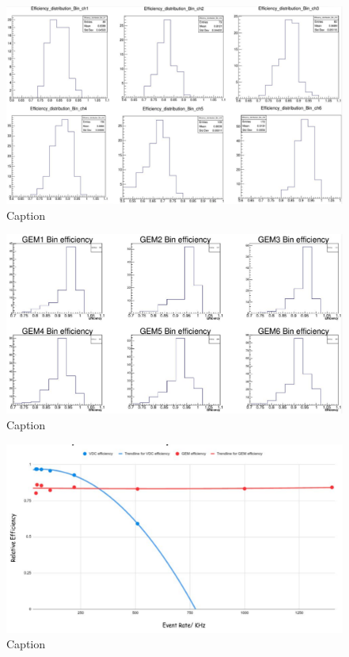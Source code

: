 \begin{figure}[!htbp]
    \centering
    \includegraphics[width=\textwidth]{images/chap5/lhrs_gem_bin_efficiency.png}
    \caption{Caption}
    \label{fig:my_label}
\end{figure}

\begin{figure}[!htbp]
    \centering
    \includegraphics[width=\textwidth]{images/chap5/rhrs_gem_bin_efficiency.png}
    \caption{Caption}
    \label{fig:my_label}
\end{figure}


\begin{figure}[!htbp]
    \centering
    \includegraphics[width=\textwidth]{images/chap5/gem efficiency over time.png}
    \caption{Caption}
    \label{fig:my_label}
\end{figure}
